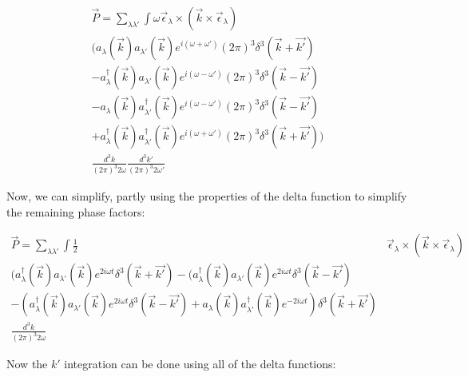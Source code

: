 \documentclass[a4]{article}
\begin{document}
    \begin{equation}
        \begin{aligned}
            \vec{P} = \sum_{\lambda \lambda'} \int \omega \vec{\epsilon}_{\lambda} \times (\vec{k} \times \vec{\epsilon}_{\lambda}) \\
            \big( a_{\lambda} (\vec{k}) a_{\lambda'} (\vec{k}) e^{i (\omega + \omega')} (2\pi)^{3} \delta^{3} (\vec{k} + \vec{k'}) \\
            - a^{\dagger}_{\lambda} (\vec{k}) a_{\lambda'} (\vec{k}) e^{i (\omega - \omega')} (2\pi)^{3} \delta^{3} (\vec{k} - \vec{k'}) \\
            - a_{\lambda} (\vec{k}) a^{\dagger}_{\lambda'} (\vec{k}) e^{i (\omega - \omega')} (2\pi)^{3} \delta^{3} (\vec{k} - \vec{k'}) \\
            + a^{\dagger}_{\lambda} (\vec{k}) a^{\dagger}_{\lambda'} (\vec{k}) e^{i (\omega + \omega')} (2\pi)^{3} \delta^{3} (\vec{k} + \vec{k'}) \big) \\
            \frac{d^{3} k}{(2 \pi)^{3} 2 \omega} \frac{d^{3} k'}{(2 \pi)^{3} 2 \omega'}
        \end{aligned}
    \end{equation}

    Now, we can simplify, partly using the properties of the delta function to simplify the remaining phase factors:
    
    \begin{equation}
        \begin{aligned}
            \vec{P} = \sum_{\lambda \lambda'} \int \frac{1}{2} & \vec{\epsilon}_{\lambda} \times (\vec{k} \times \vec{\epsilon}_{\lambda}) \\
            (a^{\dagger}_{\lambda} (\vec{k}) a_{\lambda'} (\vec{k}) e^{2 i \omega t} \delta^{3} (\vec{k} + \vec{k'}) - (a^{\dagger}_{\lambda} (\vec{k}) a_{\lambda'} (\vec{k}) e^{2 i \omega t} \delta^{3} (\vec{k} - \vec{k'}) \\
            - (a^{\dagger}_{\lambda} (\vec{k}) a_{\lambda'} (\vec{k}) e^{2 i \omega t} \delta^{3} (\vec{k} - \vec{k'}) + a_{\lambda} (\vec{k}) a^{\dagger}_{\lambda'} (\vec{k}) e^{- 2 i \omega t}) \delta^{3} (\vec{k} + \vec{k'}) \\
            \frac{d^{3} k}{(2 \pi)^{3} 2 \omega}
        \end{aligned}
    \end{equation}

    Now the $k'$ integration  can be done using all of the delta functions:
\end{document}
